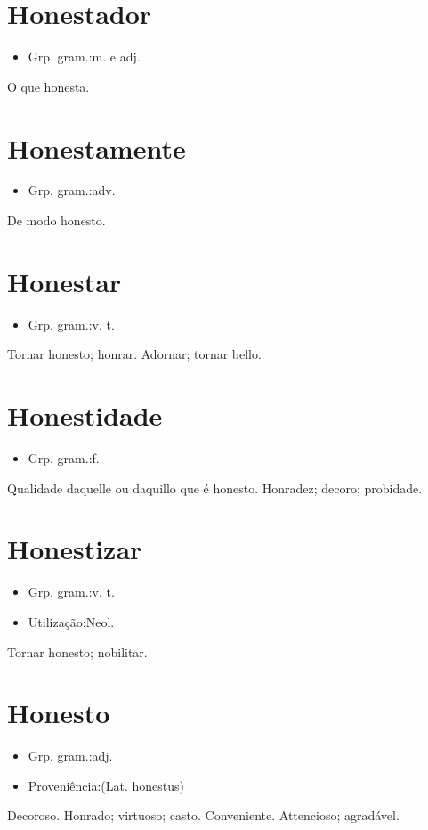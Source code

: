 \documentclass{article}
\begin{document}
\section{Honestador}
\begin{itemize}
\item {Grp. gram.:m.  e  adj.}
\end{itemize}
O que honesta.
\section{Honestamente}
\begin{itemize}
\item {Grp. gram.:adv.}
\end{itemize}
De modo honesto.
\section{Honestar}
\begin{itemize}
\item {Grp. gram.:v. t.}
\end{itemize}
Tornar honesto; honrar.
Adornar; tornar bello.
\section{Honestidade}
\begin{itemize}
\item {Grp. gram.:f.}
\end{itemize}
Qualidade daquelle ou daquillo que é honesto.
Honradez; decoro; probidade.
\section{Honestizar}
\begin{itemize}
\item {Grp. gram.:v. t.}
\end{itemize}
\begin{itemize}
\item {Utilização:Neol.}
\end{itemize}
Tornar honesto; nobilitar.
\section{Honesto}
\begin{itemize}
\item {Grp. gram.:adj.}
\end{itemize}
\begin{itemize}
\item {Proveniência:(Lat. \textunderscore honestus\textunderscore )}
\end{itemize}
Decoroso.
Honrado; virtuoso; casto.
Conveniente.
Attencioso; agradável.
\end{document}
